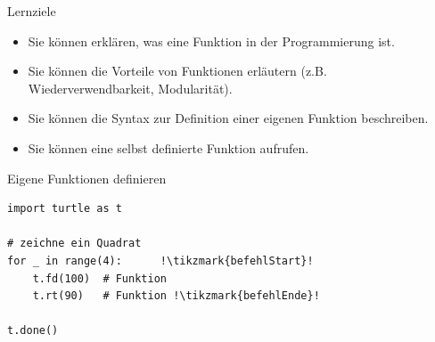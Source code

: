 \begin{frame}{Lernziele}
    \begin{itemize}
        \item Sie können erklären, was eine Funktion in der Programmierung ist.
        \item Sie können die Vorteile von Funktionen erläutern (z.B. Wiederverwendbarkeit, Modularität).
        \item Sie können die Syntax zur Definition einer eigenen Funktion beschreiben.
        \item Sie können eine selbst definierte Funktion aufrufen.
    \end{itemize}
\end{frame}

\begin{frame}[fragile]{Eigene Funktionen definieren}
\begin{lstlisting}[escapechar=!]
import turtle as t

# zeichne ein Quadrat
for _ in range(4):      !\tikzmark{befehlStart}!
    t.fd(100)  # Funktion
    t.rt(90)   # Funktion !\tikzmark{befehlEnde}!

t.done()
\end{lstlisting}
\end{frame}

